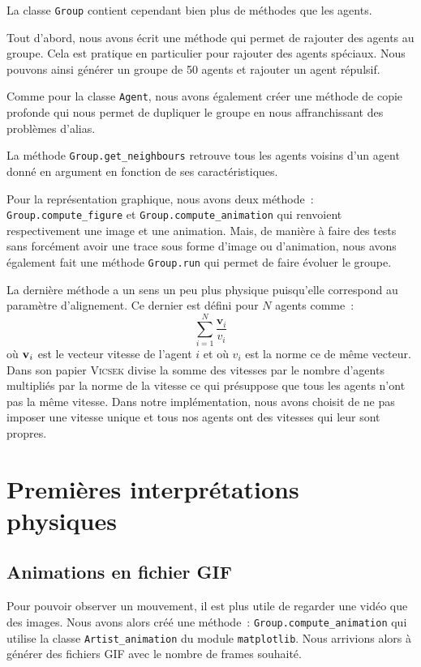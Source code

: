 \documentclass[french, a4paper, 12pt, openany]{report}
\begin{document}
	La classe \verb|Group| contient cependant bien plus de méthodes que les agents.
	
	Tout d'abord, nous avons écrit une méthode qui permet de rajouter des agents au groupe. Cela est pratique en particulier pour rajouter des agents spéciaux. Nous pouvons ainsi générer un groupe de 50 agents et rajouter un agent répulsif.
	
	Comme pour la classe \verb|Agent|, nous avons également créer une méthode de copie profonde qui nous permet de dupliquer le groupe en nous affranchissant des problèmes d'alias.
	
	La méthode \verb|Group.get_neighbours| retrouve tous les agents voisins d'un agent donné en argument en fonction de ses caractéristiques.
	
	Pour la représentation graphique, nous avons deux méthode~: \verb|Group.compute_figure| et \verb|Group.compute_animation| qui renvoient respectivement une image et une animation. Mais, de manière à faire des tests sans forcément avoir une trace sous forme d'image ou d'animation, nous avons également fait une méthode \verb|Group.run| qui permet de faire évoluer le groupe.
	
	La dernière méthode a un sens un peu plus physique puisqu'elle correspond au paramètre d'alignement. Ce dernier est défini pour $N$ agents comme~:
	\[
		\sum_{i=1}^N \frac{\textbf{v}_i}{v_i}
	\]
	où $\textbf v_i$ est le vecteur vitesse de l'agent $i$ et où $v_i$ est la norme ce de même vecteur. Dans son papier \textsc{Vicsek} divise la somme des vitesses par le nombre d'agents multipliés par la norme de la vitesse ce qui présuppose que tous les agents n'ont pas la même vitesse. Dans notre implémentation, nous avons choisit de ne pas imposer une vitesse unique et tous nos agents ont des vitesses qui leur sont propres.	

   
\chapter{Premières interprétations physiques}
\section{Animations en fichier GIF}

   Pour pouvoir observer un mouvement, il est plus utile de regarder une vidéo que des images. Nous avons alors créé une méthode~: \verb|Group.compute_animation| qui utilise la classe \verb|Artist_animation| du module \verb|matplotlib|. Nous arrivions alors à générer des fichiers GIF avec le nombre de frames souhaité.\\
   
\end{document}
